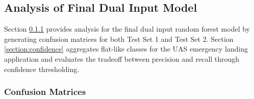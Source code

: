 \subsection{Analysis of Final Dual Input Model}

Section \ref{section:confusion_matrices} provides analysis for the final dual input random forest model by generating confusion matrices for both Test Set     1 and Test Set     2.  Section \ref{section:confidence} aggregates flat-like classes for the UAS emergency landing application and evaluates the tradeoff between precision and recall through confidence thresholding.

\subsubsection{Confusion Matrices}\label{section:confusion_matrices}

